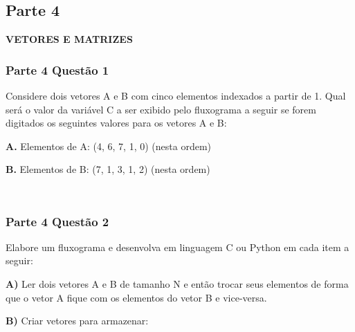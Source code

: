 \begin{DoxyCode}{0}
\DoxyCodeLine{}
\DoxyCodeLine{}
\DoxyCodeLine{}
\end{DoxyCode}


\subsection*{Parte 4}

{\bfseries{V\+E\+T\+O\+R\+ES E M\+A\+T\+R\+I\+Z\+ES}}

\subsubsection*{Parte 4 Questão 1}

Considere dois vetores A e B com cinco elementos indexados a partir de 1. Qual será o valor da variável C a ser exibido pelo fluxograma a seguir se forem digitados os seguintes valores para os vetores A e B\+:


\begin{DoxyItemize}
\item {\bfseries{A.}} Elementos de {\ttfamily A\+: (4, 6, 7, 1, 0)} (nesta ordem)
\item {\bfseries{B.}} Elementos de {\ttfamily B\+: (7, 1, 3, 1, 2)} (nesta ordem)
\end{DoxyItemize}

{\texttt{ }}

\subsubsection*{Parte 4 Questão 2}

Elabore um fluxograma e desenvolva em linguagem C ou Python em cada item a seguir\+:


\begin{DoxyItemize}
\item {\bfseries{A)}} Ler dois vetores A e B de tamanho N e então trocar seus elementos de forma que o vetor A fique com os elementos do vetor B e vice-\/versa.
\item {\bfseries{B)}} Criar vetores para armazenar\+:
\end{DoxyItemize}


\begin{DoxyCode}{0}
\DoxyCodeLine{}
\DoxyCodeLine{}
\end{DoxyCode}



